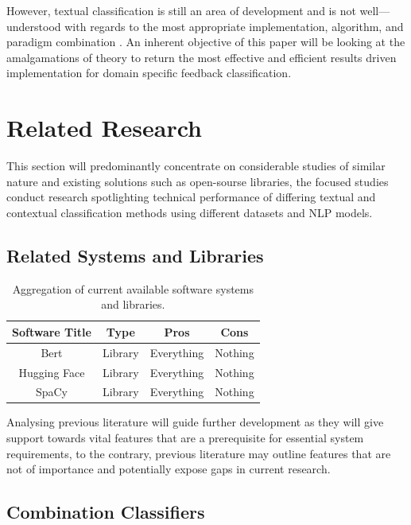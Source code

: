 However, textual classification is still an area of development and is not well---understood with regards to the most appropriate implementation, algorithm, and paradigm combination \parencite{thangaraj2018text}. An inherent objective of this paper will be looking at the amalgamations of theory to return the most effective and efficient results driven implementation for domain specific feedback classification.

\section{Related Research}

This section will predominantly concentrate on considerable studies of similar nature and existing solutions such as open-sourse libraries, the focused studies conduct research spotlighting technical performance of differing textual and contextual classification methods using different datasets and NLP models.

\subsection{Related Systems and Libraries}

\begin{table}[H]
    \centering
    \begin{tabular}{|c c c c|}
        \hline
        Software Title & Type & Pros & Cons \\ [0.5ex]
        \hline
        Bert & Library & Everything & Nothing \\
        \hline
        Hugging Face & Library & Everything & Nothing \\
        \hline
        SpaCy & Library & Everything & Nothing \\ [1ex]
        \hline
    \end{tabular}
   \caption{Aggregation of current available software systems and libraries.}
   \label{tab:C2RelatedSystems}
\end{table}

Analysing previous literature will guide further development as they will give support towards vital features that are a prerequisite for essential system requirements, to the contrary, previous literature may outline features that are not of importance and potentially expose gaps in current research.

\subsection{Combination Classifiers}

